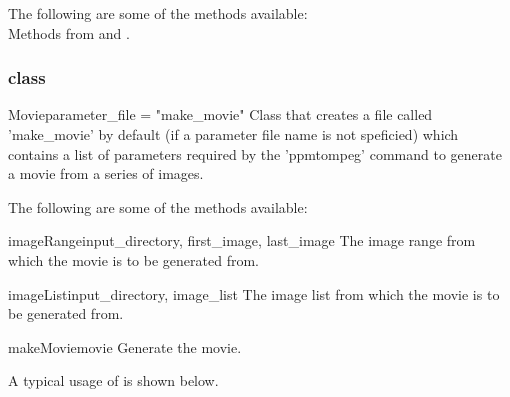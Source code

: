 The following are some of the methods available:\\
Methods from \ImageReslice and \ActorTwoD.

\subsubsection{\Movie class}

\begin{classdesc}{Movie}{parameter_file = "make_movie"}
Class that creates a file called 'make_movie' by default (if a parameter
file name is not speficied) which contains a list of parameters required
by the 'ppmtompeg' command to generate a movie from a series of images.
\end{classdesc}

The following are some of the methods available:\\
\begin{methoddesc}[Movie]{imageRange}{input_directory, first_image, last_image}
The image range from which the movie is to be generated from.
\end{methoddesc}

\begin{methoddesc}[Movie]{imageList}{input_directory, image_list}
The image list from which the movie is to be generated from.
\end{methoddesc}

\begin{methoddesc}[Movie]{makeMovie}{movie}
Generate the movie.
\end{methoddesc}

A typical usage of \Movie is shown below.

